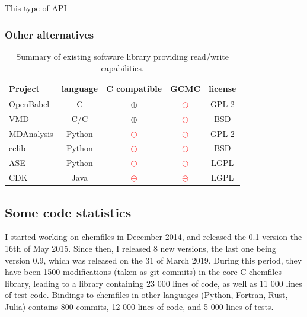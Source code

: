 \documentclass[thesis]{subfiles}
\def\cxx{{C\nolinebreak[4]\hspace{-.05em}\raisebox{.3ex}{\footnotesize ++}}\xspace}
\begin{document}
This type of API \TODO

\subsubsection{Other alternatives}

\begin{table}[ht]
    \centering
    \caption{Summary of existing software library providing read/write capabilities.}
    \label{tab:chemfiles:alternatives}
    \def\nope{\textcolor{red}{\Large$\circleddash$}}
    \def\yep{\textcolor{webgreen}{\Large$\oplus$}}
    \begin{tabularx}{0.8\textwidth}{X c c c c}
        \toprule
            \bfseries Project            & language & \cxx compatible & GCMC  & license \\
        \midrule
            OpenBabel\cite{OBoyle2011}   &   \cxx   &      \yep       & \nope & GPL-2   \\
            VMD\cite{Humphrey1996}       &  C/\cxx  &      \yep       & \nope & BSD     \\
            MDAnalysis\cite{Michaud2011} &  Python  &      \nope      & \nope & GPL-2   \\
            cclib\cite{OBoyle2008}       &  Python  &      \nope      & \nope & BSD     \\
            ASE\cite{HjorthLarsen2017}   &  Python  &      \nope      & \nope & LGPL    \\
            CDK\cite{Willighagen2017}    &  Java    &      \nope      & \nope & LGPL    \\
        \bottomrule
    \end{tabularx}
\end{table}

\subsection{Some code statistics}

I started working on chemfiles in December 2014, and released the 0.1 version
the 16th of May 2015. Since then, I released 8 new versions, the last one being
version 0.9, which was released on the 31 of March 2019. During this period,
they have been 1500 modifications (taken as git commits) in the core \cxx
chemfiles library, leading to a library containing 23 000 lines of code, as well
as 11 000 lines of test code. Bindings to chemfiles in other languages (Python,
Fortran, Rust, Julia) contains 800 commits, 12 000 lines of code, and 5 000
lines of tests.
\end{document}
